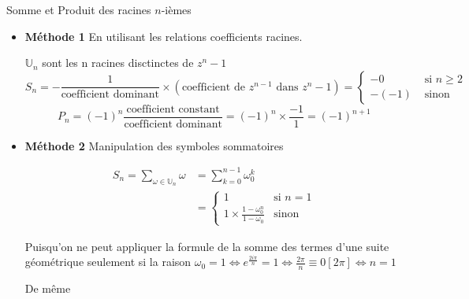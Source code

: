 \documentclass{article}
\begin{document}
\begin{question_kholle}{Somme et Produit des racines $n$-ièmes}
	\begin{itemize}[label=$\lozenge$]
		\item \textbf{Méthode 1} En utilisant les relations coefficients racines.

		      $\mathbb{U}_{n}$ sont les n racines disctinctes de $z^{n}-1$
		      $$S_{n} = - \frac{1}{\text{coefficient dominant}}\times(\text{coefficient de }z^{n-1} \text{ dans }z^{n}-1)= \left\{ \begin{array}{ll}
				      -0    & \text{ si }  n\geqslant 2 \\
				      -(-1) & \text{ sinon}
			      \end{array}\right.$$
		      $$
			      P_{n} = (-1)^{n} \frac{\text{coefficient constant}}{\text{coefficient dominant}} = (-1) ^{n}\times \frac{-1}{1} = (-1)^{n+1}
		      $$

		\item \textbf{Méthode 2} Manipulation des symboles sommatoires

		      \begin{align*}
			      S_{n} = \sum_{\omega \in \mathbb{U}_{n}}\omega & = \sum_{k=0}^{n-1}\omega_{0}^{k}                                                                    \\
			                                                     & = \left\{ \begin{array}{ll}
				                                                                 1                                                & \text{si }  n =1 \\
				                                                                 1 \times \frac{1 - \omega_{0}^{n}}{1-\omega_{0}} & \text{sinon}
			                                                                 \end{array}\right.
		      \end{align*}

		      Puisqu'on ne peut appliquer la formule de la somme des termes d'une suite géométrique seulement si la raison $\omega_{0} = 1 \iff e^{\frac{2i\pi}{n}} = 1 \iff \frac{2\pi}{n} \equiv 0 [2\pi] \iff n = 1$

		      De même


\end{itemize}
\end{question_kholle}
\end{document}
